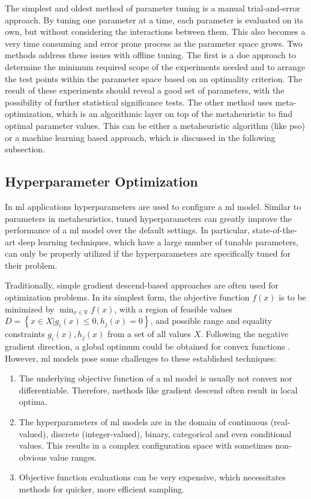 The simplest and oldest method of parameter tuning is a manual trial-and-error approach. By tuning one parameter at a time, each parameter is evaluated on its own, but without considering the interactions between them. This also becomes a very time consuming and error prone process as the parameter space grows.
Two methods address these issues with offline tuning. The first is a \gls{doe} approach to determine the minimum required scope of the experiments needed and to arrange the test points within the parameter space based on an optimality criterion. The result of these experiments should reveal a good set of parameters, with the possibility of further statistical significance tests.  
The other method uses meta-optimization, which is an algorithmic layer on top of the metaheuristic to find optimal parameter values. This can be either a metaheuristic algorithm (like \gls{pso}) or a machine learning based approach, which is discussed in the following subsection.


\subsection{Hyperparameter Optimization}
\label{chap:hyperopt}

In \gls{ml} applications hyperparameters are used to configure a \gls{ml} model. Similar to parameters in metaheuristics, tuned hyperparameters can greatly improve the performance of a \gls{ml} model over the default settings. In particular, state-of-the-art deep learning techniques, which have a large number of tunable parameters, can only be properly utilized if the hyperparameters are specifically tuned for their problem.

Traditionally, simple gradient descend-based approaches are often used for optimization problems. In its simplest form, the objective function $f(x)$ is to be minimized by $\min_{x \in \mathbb{R}} f(x)$, with a region of feasible values $D = \left\lbrace { x \in X | g_i(x) \leq 0, h_j(x) = 0}\right\rbrace $, and possible range and equality constraints $g_i(x), h_j(x)$ from a set of all values $X$. Following the negative gradient direction, a global optimum could be obtained for convex functions \cite{yang2020hyperparameter}. 
However, \gls{ml} models pose some challenges to these established techniques:
\begin{enumerate}
	\item The underlying objective function of a \gls{ml} model is usually not convex nor differentiable. Therefore, methods like gradient descend often result in local optima.
	\item The hyperparameters of \gls{ml} models are in the domain of continuous (real-valued),  discrete (integer-valued), binary, categorical and even conditional values. This results in a complex configuration space with sometimes non-obvious value ranges.
	\item Objective function evaluations can be very expensive, which necessitates methods for quicker, more efficient sampling. 
\end{enumerate}

